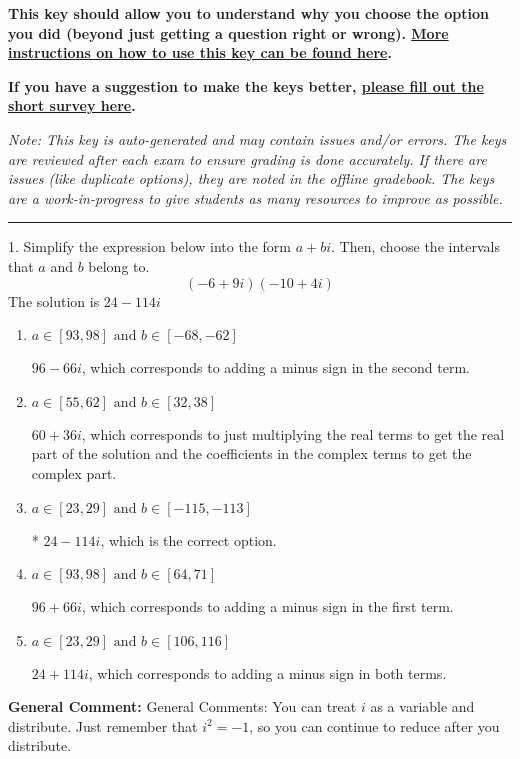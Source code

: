 \documentclass{extbook}[14pt]
\begin{document}
\textbf{This key should allow you to understand why you choose the option you did (beyond just getting a question right or wrong). \href{https://xronos.clas.ufl.edu/mac1105spring2020/courseDescriptionAndMisc/Exams/LearningFromResults}{More instructions on how to use this key can be found here}.}

\textbf{If you have a suggestion to make the keys better, \href{https://forms.gle/CZkbZmPbC9XALEE88}{please fill out the short survey here}.}

\textit{Note: This key is auto-generated and may contain issues and/or errors. The keys are reviewed after each exam to ensure grading is done accurately. If there are issues (like duplicate options), they are noted in the offline gradebook. The keys are a work-in-progress to give students as many resources to improve as possible.}

\rule{\textwidth}{0.4pt}

1. Simplify the expression below into the form $a+bi$. Then, choose the intervals that $a$ and $b$ belong to.
\[ (-6  + 9 i)(-10  + 4 i) \] 
The solution is $ 24  - 114 i $ 

\begin{enumerate}[label=\Alph*.] 
\item $ a \in [93, 98] \text{ and } b \in [-68, -62] $ 

  $96  - 66 i$, which corresponds to adding a minus sign in the second term. 
\item $ a \in [55, 62] \text{ and } b \in [32, 38] $ 

  $60  + 36 i$, which corresponds to just multiplying the real terms to get the real part of the solution and the coefficients in the complex terms to get the complex part. 
\item $ a \in [23, 29] \text{ and } b \in [-115, -113] $ 

 * $24  - 114 i$, which is the correct option. 
\item $ a \in [93, 98] \text{ and } b \in [64, 71] $ 

  $96  + 66 i$, which corresponds to adding a minus sign in the first term. 
\item $ a \in [23, 29] \text{ and } b \in [106, 116] $ 

  $24  + 114 i$, which corresponds to adding a minus sign in both terms. 
\end{enumerate} 
 
\textbf{General Comment:} General Comments: You can treat $i$ as a variable and distribute. Just remember that $i^2=-1$, so you can continue to reduce after you distribute. 
\end{document}
